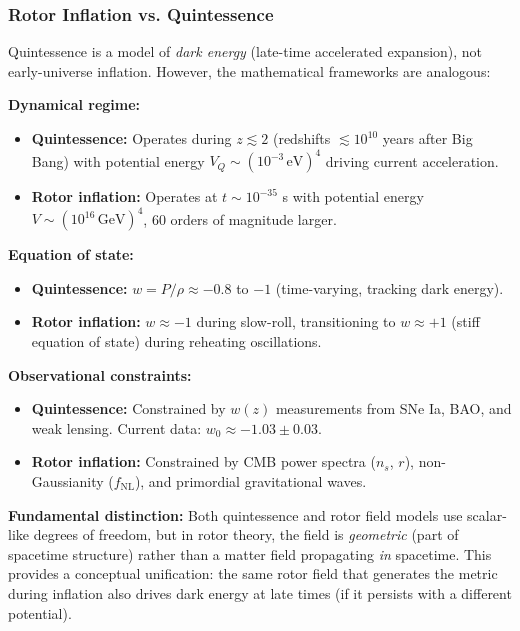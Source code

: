 \documentclass[11pt,a4paper]{article}
\numberwithin{equation}{section}
\theoremstyle{plain}
\theoremstyle{definition}
\theoremstyle{remark}
\begin{document}
\subsubsection{Rotor Inflation vs. Quintessence}

Quintessence is a model of \emph{dark energy} (late-time accelerated expansion), not early-universe inflation. However, the mathematical frameworks are analogous:

\textbf{Dynamical regime:}
\begin{itemize}
  \item \textbf{Quintessence:} Operates during $z \lesssim 2$ (redshifts $\lesssim 10^{10}$ years after Big Bang) with potential energy $V_Q \sim (10^{-3}\,\mathrm{eV})^4$ driving current acceleration.
  \item \textbf{Rotor inflation:} Operates at $t \sim 10^{-35}$ s with potential energy $V \sim (10^{16}\,\mathrm{GeV})^4$, 60 orders of magnitude larger.
\end{itemize}

\textbf{Equation of state:}
\begin{itemize}
  \item \textbf{Quintessence:} $w = P/\rho \approx -0.8$ to $-1$ (time-varying, tracking dark energy).
  \item \textbf{Rotor inflation:} $w \approx -1$ during slow-roll, transitioning to $w \approx +1$ (stiff equation of state) during reheating oscillations.
\end{itemize}

\textbf{Observational constraints:}
\begin{itemize}
  \item \textbf{Quintessence:} Constrained by $w(z)$ measurements from SNe Ia, BAO, and weak lensing. Current data: $w_0 \approx -1.03 \pm 0.03$.
  \item \textbf{Rotor inflation:} Constrained by CMB power spectra ($n_s$, $r$), non-Gaussianity ($f_{\mathrm{NL}}$), and primordial gravitational waves.
\end{itemize}

\textbf{Fundamental distinction:}
Both quintessence and rotor field models use scalar-like degrees of freedom, but in rotor theory, the field is \emph{geometric} (part of spacetime structure) rather than a matter field propagating \emph{in} spacetime. This provides a conceptual unification: the same rotor field that generates the metric during inflation also drives dark energy at late times (if it persists with a different potential).
\end{document}
